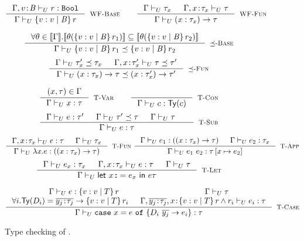 \newcommand\restrictdecidable[2]{#2}
\begin{figure}[t!]
\centering
\captionsetup{justification=centering}

$$
\inference
   {\undechastype{\Gamma, \tbind{v}{\Base}}
                 {\restrictdecidable{p}{r}}{\tbool}
   }
   {\undeciswellformed{\Gamma}{\tref{v}{\Base}{}{\restrictdecidable{p}{r}}}}
   [\rwbase]
\qquad
\inference{
	\undeciswellformed{\Gamma}{\tau_x} &&
	\undeciswellformed{\Gamma, \tbind{x}{\tau_x}}{\tau}
}{
	\undeciswellformed{\Gamma}{\tfunref{x}{\tau_x}{\tau}{v}{e}}
}[\rwfun]
$$


$$
\inference{
  {\forall \sto\in \interp{\Env}. 
  		 \interp{\thetasub{\sto}{\tref{v}{\Base}{}{\restrictdecidable{p_1}{r_1}}}} 
  		\subseteq   \interp{\thetasub{\sto}{\tref{v}{\Base}{}{\restrictdecidable{p_2}{r_2}}}}}
}{
	\undecissubtype{\Gamma}
		{\tref{v}{\Base}{}{\restrictdecidable{p_1}{r_1}}}
		{\tref{v}{\Base}{}{\restrictdecidable{p_2}{r_2}}}
}[\rsubbase]
$$
$$
\inference{
	\undecissubtype{\Gamma}{\tau'_x}{\tau_x} &&
	\undecissubtype{\Gamma, \tbind{x}{\tau'_x}}{\tau}{\tau'}
}{
	\undecissubtype{\Gamma}{\tfunref{x}{\tau_x}{\tau}{v}{e_1}}{\tfunref{x}{\tau'_x}{\tau'}{v}{e_2}}
}[\rsubfun]
$$

$$
\inference{
	(x,\tau) \in \Gamma 
}{
	\undechastype{\Gamma}{x}{\tau}
}[\rtvar]
\qquad
\inference{
}{
	\undechastype{\Gamma}{c}{\constty{c}}
}[\rtconst]
$$
$$
\inference{
	\undechastype{\Gamma}{e}{\tau'} &&
	\undecissubtype{\Gamma}{\tau'}{\tau} &&
	\undeciswellformed{\Gamma}{\tau} &&
}{
	\undechastype{\Gamma}{e}{\tau}
}[\rtsub]
$$
$$
\inference{
	\undechastype{\Gamma, \tbind{x}{\tau_x}}{e}{\tau} &&
	\undeciswellformed{\Gamma}{\tau_x}
}{
	\undechastype{\Gamma}{\efun{x}{\tau_x}{e}}{(\tfun{x}{\tau_x}{\tau})}
}[\rtfun]
\
\inference{
	\undechastype{\Gamma}{e_1}{(\tfunref{x}{\tau_{x}}{\tau}{v}{e_v})} &&
	\undechastype{\Gamma}{\restrictdecidable{y}{e_2}}{\tau_{x}}
}{
	\undechastype{\Gamma}{\eapp{e_1}{\restrictdecidable{y}{e_2}}}{\tau\sub{x}{\restrictdecidable{y}{e_2}}}
}[\rtapp]
$$
$$
\inference{
	\undechastype{\Gamma}{e_x}{\tau_{x}} &&
	\undechastype{\Gamma,\tbind{x}{\tau_x}}{e}{\tau} &&
	\undeciswellformed{\Gamma}{\tau}
}{
	\undechastype{\Gamma}{\elet{x}{e_x}{e}}{\tau}
}[\rtlet]
$$

$$\inference{
	\undechastype{\Gamma}{e}{\tref{v}{T}{}{r}} &&
	 \undeciswellformed{\Gamma}{\tau}\\
     \forall i. \constty{D_i} = \overline{\tbind{y_j}{\tau_j}} \rightarrow \tref{v}{T}{}{r_i} &&
      \undechastype{\Gamma, \overline{\tbind{y_j}{\tau_j}}, \tbind{x}{\tref{v}{T}{}{r \land r_i}}}{e_i}{\tau}  \\
}{
	\undechastype{\Gamma}{\ecase{e}{D_i}{\overline{y_j}}{e_i}{x}}{\tau}
}[\rtcase]$$
\caption[Type checking of $\protect\undeclang$.]{Type checking of \undeclang.}
\label{fig:refinedhaskell:typing}
\end{figure}

